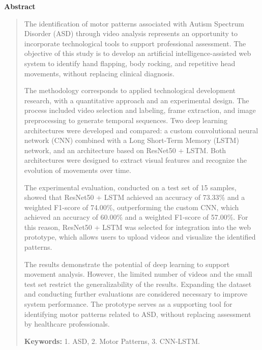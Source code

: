 \thispagestyle{empty}
\begin{center}
\begin{LARGE}
\textbf{Abstract}
\end{LARGE}
\end{center}

\begin{quotation}
The identification of motor patterns associated with Autism Spectrum Disorder (ASD) through video analysis represents an opportunity to incorporate technological tools to support professional assessment. The objective of this study is to develop an artificial intelligence-assisted web system to identify hand flapping, body rocking, and repetitive head movements, without replacing clinical diagnosis.

The methodology corresponds to applied technological development research, with a quantitative approach and an experimental design. The process included video selection and labeling, frame extraction, and image preprocessing to generate temporal sequences. Two deep learning architectures were developed and compared: a custom convolutional neural network (CNN) combined with a Long Short-Term Memory (LSTM) network, and an architecture based on ResNet50 + LSTM. Both architectures were designed to extract visual features and recognize the evolution of movements over time.

The experimental evaluation, conducted on a test set of 15 samples, showed that ResNet50 + LSTM achieved an accuracy of 73.33\% and a weighted F1-score of 74.00\%, outperforming the custom CNN, which achieved an accuracy of 60.00\% and a weighted F1-score of 57.00\%. For this reason, ResNet50 + LSTM was selected for integration into the web prototype, which allows users to upload videos and visualize the identified patterns.

The results demonstrate the potential of deep learning to support movement analysis. However, the limited number of videos and the small test set restrict the generalizability of the results. Expanding the dataset and conducting further evaluations are considered necessary to improve system performance. The prototype serves as a supporting tool for identifying motor patterns related to ASD, without replacing assessment by healthcare professionals.


\vspace*{0.5cm}


\noindent \textbf{Keywords:} 1. ASD, 2. Motor Patterns, 3. CNN-LSTM.

\end{quotation}